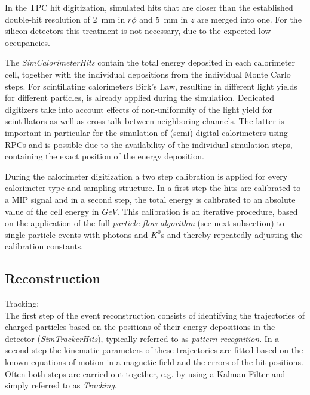 In the TPC hit digitization, simulated hits that are closer than the established double-hit resolution of 2~mm in $r\phi$ and 5~mm
in $z$ are merged into one. For the silicon detectors this treatment is not necessary, due to the expected low occupancies.

The \emph{SimCalorimeterHits} contain the total energy deposited in each calorimeter cell, together with the individual depositions
from the individual Monte Carlo steps. For scintillating calorimeters Birk's Law, resulting in different light yields for different
particles, is already applied during the simulation. Dedicated digitizers take into account effects of non-uniformity of the light yield
for scintillators as well as cross-talk between neighboring channels. The latter is important in particular for the simulation of
(semi)-digital calorimeters using RPCs and is possible due to the availability of the individual simulation steps, containing
the exact position of the energy deposition.

During the calorimeter digitization a two step calibration is applied for every calorimeter type and sampling structure. In a first step
the hits are calibrated to a MIP signal and in a second step, the total energy is calibrated to an absolute value of the
cell energy in $GeV$. This calibration is an iterative procedure, based on the application of the full
\emph{particle flow algorithm }(see next subsection) to single particle events with photons and $K^0$s and thereby
repeatedly adjusting the calibration constants.


  
\subsection{\label{sub:sw-reco}Reconstruction}

Tracking: \\

The first step of the event reconstruction consists of identifying the trajectories of charged particles based on the positions of their
energy depositions in the detector (\emph{SimTrackerHits}), typically referred to as \emph{pattern recognition}. In a second step the
kinematic parameters of these trajectories are fitted based on the known equations of motion in a magnetic field and the errors of the
hit positions. Often both steps are carried out together, e.g. by using a Kalman-Filter and simply referred to as \emph{Tracking}.

